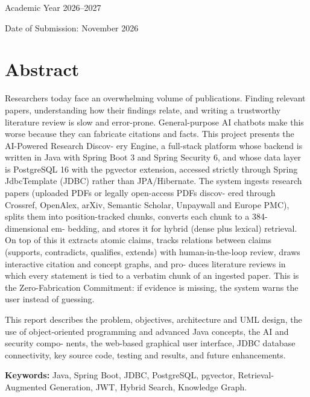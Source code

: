 \documentclass[11pt,a4paper,titlepage]{report}
\begin{document}
\begin{titlepage}
    \vspace{1.2cm}
    {\large Academic Year 2026--2027\par}
    {\normalsize Date of Submission: November 2026\par}
\end{titlepage}

\chapter*{Abstract}

Researchers today face an overwhelming volume of publications. Finding relevant papers,
understanding how their findings relate, and writing a trustworthy literature review is
slow and error-prone. General-purpose AI chatbots make this worse because they can
fabricate citations and facts. This project presents the AI-Powered Research Discov-
ery Engine, a full-stack platform whose backend is written in Java with Spring Boot 3
and Spring Security 6, and whose data layer is PostgreSQL 16 with the pgvector extension,
accessed strictly through Spring JdbcTemplate (JDBC) rather than JPA/Hibernate.
The system ingests research papers (uploaded PDFs or legally open-access PDFs discov-
ered through Crossref, OpenAlex, arXiv, Semantic Scholar, Unpaywall and Europe PMC),
splits them into position-tracked chunks, converts each chunk to a 384-dimensional em-
bedding, and stores it for hybrid (dense plus lexical) retrieval. On top of this it extracts
atomic claims, tracks relations between claims (supports, contradicts, qualifies, extends)
with human-in-the-loop review, draws interactive citation and concept graphs, and pro-
duces literature reviews in which every statement is tied to a verbatim chunk of an ingested
paper. This is the Zero-Fabrication Commitment: if evidence is missing, the system
warns the user instead of guessing.

This report describes the problem, objectives, architecture and UML design, the use of
object-oriented programming and advanced Java concepts, the AI and security compo-
nents, the web-based graphical user interface, JDBC database connectivity, key source
code, testing and results, and future enhancements.
\vspace{1em}

\noindent\textbf{Keywords:} Java, Spring Boot, JDBC, PostgreSQL, pgvector, Retrieval-Augmented Generation, JWT, Hybrid Search, Knowledge Graph.
\end{document}
